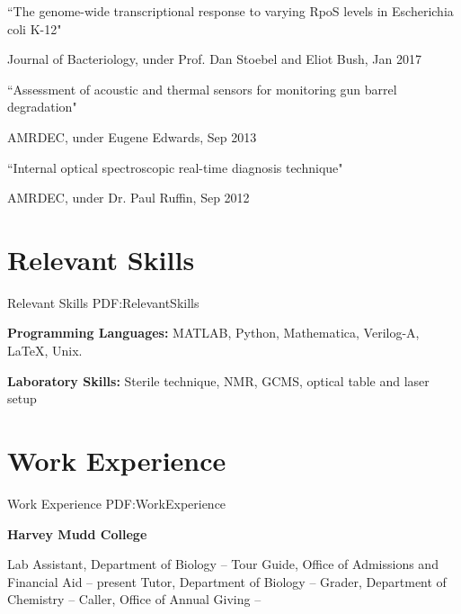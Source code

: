 \documentclass[letterpaper,10pt,oneside]{article}
\begin{document}
\begin{body}
\BulletItemBullet
``The genome-wide transcriptional response to varying RpoS levels in Escherichia coli K-12"
\begin{detail}
\SubBulletItem
Journal of Bacteriology, under Prof. Dan Stoebel and Eliot Bush, Jan 2017
\end{detail}

\Gap

\BulletItemBullet
``Assessment of acoustic and thermal sensors for monitoring gun barrel degradation"
\begin{detail}
\SubBulletItem
AMRDEC, under Eugene Edwards, Sep 2013
\end{detail}

\Gap

\BulletItemBullet
``Internal optical spectroscopic real-time diagnosis technique"
\begin{detail}
\SubBulletItem
AMRDEC, under Dr. Paul Ruffin, Sep 2012
\end{detail}


\section
{Relevant Skills}
{Relevant Skills}
{PDF:RelevantSkills}

{\textbf{Programming Languages:}}
MATLAB, Python, Mathematica, Verilog-A, \LaTeX, Unix.

\Gap

{\textbf{Laboratory Skills:}}
Sterile technique, NMR, GCMS, optical table and laser setup


\section
{Work Experience}
{Work Experience}
{PDF:WorkExperience}

{\textbf{Harvey Mudd College}}

\GapNoBreak
\BulletItem
Lab Assistant, Department of Biology \hfill
{} --
\BulletItem
Tour Guide, Office of Admissions and Financial Aid \hfill
{} --
present
\BulletItem
Tutor, Department of Biology \hfill
{} --
\BulletItem
Grader, Department of Chemistry \hfill
{} --
\BulletItem
Caller, Office of Annual Giving \hfill
{} --


\end{body}
\end{document}
